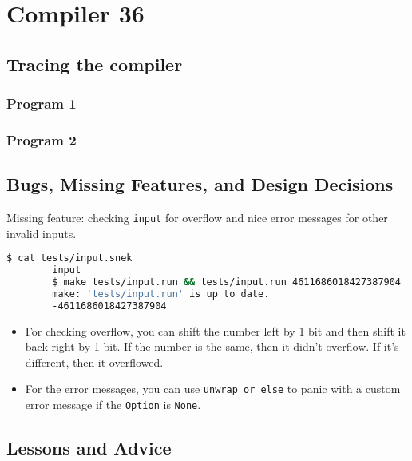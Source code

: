 	\chapter*{Compiler 36}

	\section{Tracing the compiler}

	\subsection{Program 1}

	\subsection{Program 2}

	\section{Bugs, Missing Features, and Design Decisions}

	Missing feature: checking \verb|input| for overflow and nice error messages for other invalid inputs.

	\begin{lstlisting}[language=bash, numbers=none]
		$ cat tests/input.snek
		input
		$ make tests/input.run && tests/input.run 4611686018427387904
		make: 'tests/input.run' is up to date.
		-4611686018427387904
	\end{lstlisting}

	\begin{itemize}
		\item For checking overflow, you can shift the number left by 1 bit and then shift it back right by 1 bit. If the number is the same, then it didn't overflow. If it's different, then it overflowed.

		\item For the error messages, you can use \verb|unwrap_or_else| to panic with a custom error message if the \verb|Option| is \verb|None|.
	\end{itemize}

	\section{Lessons and Advice}


